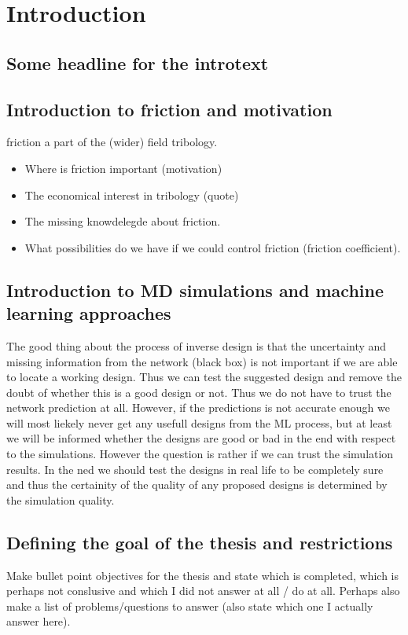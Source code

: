 \chapter*{Introduction}

\section{Some headline for the introtext}

\section{Introduction to friction and motivation}
friction a part of the (wider) field tribology.

\begin{itemize}
    \item Where is friction important (motivation)
    \item The economical interest in tribology (quote)
    \item The missing knowdelegde about friction.
    \item What possibilities do we have if we could control friction (friction coefficient).
\end{itemize}


\section{Introduction to MD simulations and machine learning approaches}


The good thing about the process of inverse design is that the uncertainty and missing information from the network (black box) is not important if we are able to locate a working design. Thus we can test the suggested design and remove the doubt of whether this is a good design or not. Thus we do not have to trust the network prediction at all. However, if the predictions is not accurate enough we will most liekely never get any usefull designs from the ML process, but at least we will be informed whether the designs are good or bad in the end with respect to the simulations. However the question is rather if we can trust the simulation results. In the ned we should test the designs in real life to be completely sure and thus the certainity of the quality of any proposed designs is determined by the simulation quality. 


\section{Defining the goal of the thesis and restrictions}
Make bullet point objectives for the thesis and state which is completed, which is perhaps not conslusive and which I did not answer at all / do at all. Perhaps also make a list of problems/questions to answer (also state which one I actually answer here).


